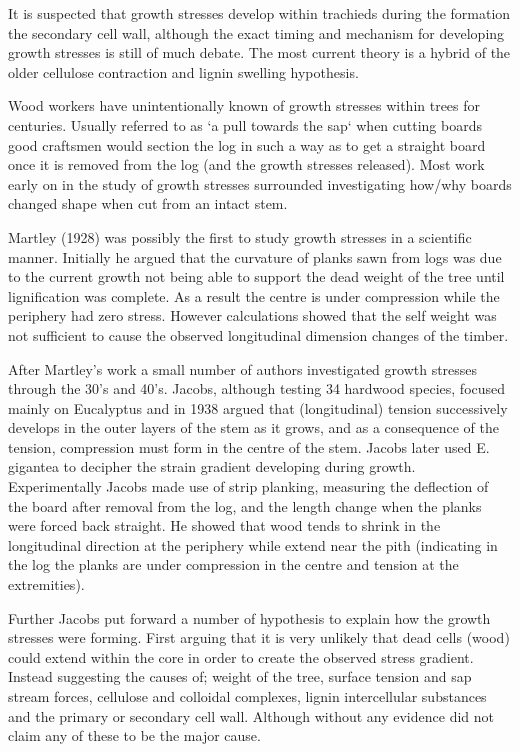 \documentclass{article}
\begin{document}
It is suspected that growth stresses develop within trachieds during the
formation the secondary cell wall, although the exact timing and mechanism for
developing growth stresses is still of much debate. The most current theory is
a hybrid of the older cellulose contraction and lignin swelling hypothesis.

Wood workers have unintentionally known of growth stresses within trees
for centuries. Usually referred to as `a pull towards the sap` when cutting boards good
craftsmen would section the log in such a way as to get a straight board once it
is removed from the log (and the growth stresses released). Most work early on in
the study of growth stresses surrounded investigating how/why boards changed
shape when cut from an intact stem.

Martley (1928) was possibly the first to study growth stresses in a scientific
manner. Initially he argued that the curvature of planks sawn from logs was due
to the current growth not being able to support the dead weight of the tree until
lignification was complete. As a result the centre is under compression while
the periphery had zero stress. However calculations showed that the self weight
was not sufficient to cause the observed longitudinal dimension changes of the
timber.

After Martley's work a small number of authors investigated growth stresses
through the 30's and 40's. Jacobs, although testing 34 hardwood species, focused
mainly on Eucalyptus and in 1938 argued that (longitudinal) tension successively
develops in the outer layers of the stem as it grows, and as a consequence of
the tension, compression must form in the centre of the stem. Jacobs later used
E. gigantea to decipher the strain gradient developing during growth.
Experimentally Jacobs made use of strip planking, measuring the deflection of
the board after removal from the log, and the length change when the planks were
forced back straight. He showed that wood tends to shrink in the longitudinal
direction at the periphery while extend near the pith (indicating in the log
the planks are under compression in the centre and tension at the extremities).

Further Jacobs put forward a number of hypothesis to explain how the growth
stresses were forming. First arguing that it is very unlikely that dead cells
(wood) could extend within the core in order to create the observed stress
gradient. Instead suggesting the causes of; weight of the tree, surface tension
and sap stream forces, cellulose and colloidal complexes, lignin intercellular
substances and the primary or secondary cell wall. Although without any evidence
did not claim any of these to be the major cause.
\end{document}

